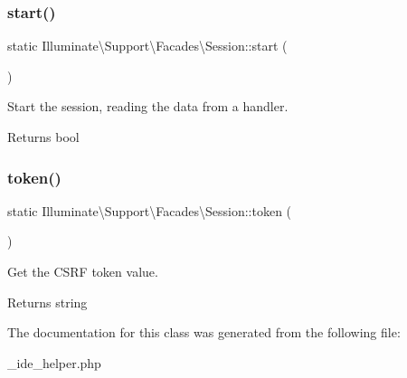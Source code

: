 \subsubsection{\texorpdfstring{start()}{start()}}
{\footnotesize\ttfamily static Illuminate\textbackslash{}\+Support\textbackslash{}\+Facades\textbackslash{}\+Session\+::start (\begin{DoxyParamCaption}{ }\end{DoxyParamCaption})\hspace{0.3cm}{\ttfamily [static]}}

Start the session, reading the data from a handler.

\begin{DoxyReturn}{Returns}
bool 
\end{DoxyReturn}
\mbox{\label{class_illuminate_1_1_support_1_1_facades_1_1_session_a48311bac3e8b34fdcd461416128ba348}} 
\subsubsection{\texorpdfstring{token()}{token()}}
{\footnotesize\ttfamily static Illuminate\textbackslash{}\+Support\textbackslash{}\+Facades\textbackslash{}\+Session\+::token (\begin{DoxyParamCaption}{ }\end{DoxyParamCaption})\hspace{0.3cm}{\ttfamily [static]}}

Get the C\+S\+RF token value.

\begin{DoxyReturn}{Returns}
string 
\end{DoxyReturn}


The documentation for this class was generated from the following file\+:\begin{DoxyCompactItemize}
\item 
\+\_\+ide\+\_\+helper.\+php\end{DoxyCompactItemize}
